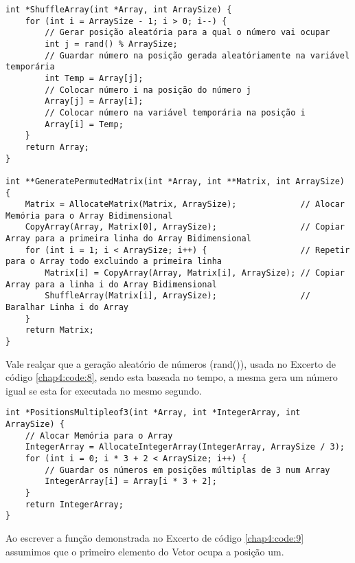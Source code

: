 \begin{lstlisting}[caption=Gerar Matriz de Permutações., label=chap4:code:8]
int *ShuffleArray(int *Array, int ArraySize) {
    for (int i = ArraySize - 1; i > 0; i--) {
        // Gerar posição aleatória para a qual o número vai ocupar
        int j = rand() % ArraySize;
        // Guardar número na posição gerada aleatóriamente na variável temporária
        int Temp = Array[j];
        // Colocar número i na posição do número j
        Array[j] = Array[i];
        // Colocar número na variável temporária na posição i
        Array[i] = Temp;
    }
    return Array;
}

int **GeneratePermutedMatrix(int *Array, int **Matrix, int ArraySize) {
    Matrix = AllocateMatrix(Matrix, ArraySize);             // Alocar Memória para o Array Bidimensional
    CopyArray(Array, Matrix[0], ArraySize);                 // Copiar Array para a primeira linha do Array Bidimensional
    for (int i = 1; i < ArraySize; i++) {                   // Repetir para o Array todo excluindo a primeira linha
        Matrix[i] = CopyArray(Array, Matrix[i], ArraySize); // Copiar Array para a linha i do Array Bidimensional
        ShuffleArray(Matrix[i], ArraySize);                 // Baralhar Linha i do Array
    }
    return Matrix;
}
\end{lstlisting}

Vale realçar que a geração aleatório de números (rand()), usada no Excerto de código \ref{chap4:code:8}, sendo esta baseada no tempo, a mesma gera um número igual se esta for executada no mesmo segundo.

\begin{lstlisting}[caption= Posições Múltiplas de três., label=chap4:code:9]
int *PositionsMultipleof3(int *Array, int *IntegerArray, int ArraySize) {
    // Alocar Memória para o Array
    IntegerArray = AllocateIntegerArray(IntegerArray, ArraySize / 3);
    for (int i = 0; i * 3 + 2 < ArraySize; i++) {
        // Guardar os números em posições múltiplas de 3 num Array
        IntegerArray[i] = Array[i * 3 + 2];
    }
    return IntegerArray;
}
\end{lstlisting}

Ao escrever a função demonstrada no Excerto de código \ref{chap4:code:9} assumimos que o primeiro elemento do Vetor ocupa a posição um.

